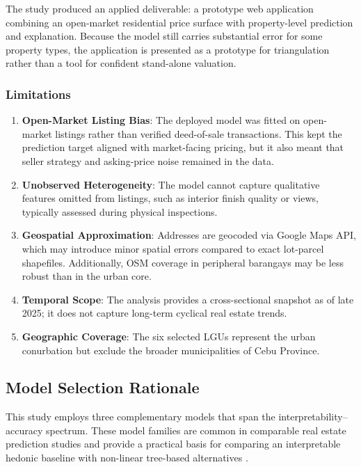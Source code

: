 The study produced an applied deliverable: a prototype web application combining an open-market residential price surface with property-level prediction and explanation. Because the model still carries substantial error for some property types, the application is presented as a prototype for triangulation rather than a tool for confident stand-alone valuation.

\subsubsection{Limitations}\label{limitations}

\begin{enumerate}
\item \textbf{Open-Market Listing Bias}: The deployed model was fitted on open-market listings rather than verified deed-of-sale transactions. This kept the prediction target aligned with market-facing pricing, but it also meant that seller strategy and asking-price noise remained in the data.
\item \textbf{Unobserved Heterogeneity}: The model cannot capture qualitative features omitted from listings, such as interior finish quality or views, typically assessed during physical inspections.
\item \textbf{Geospatial Approximation}: Addresses are geocoded via Google Maps API, which may introduce minor spatial errors compared to exact lot-parcel shapefiles. Additionally, OSM coverage in peripheral barangays may be less robust than in the urban core.
\item \textbf{Temporal Scope}: The analysis provides a cross-sectional snapshot as of late 2025; it does not capture long-term cyclical real estate trends.
\item \textbf{Geographic Coverage}: The six selected LGUs represent the urban conurbation but exclude the broader municipalities of Cebu Province.
\end{enumerate}


\subsection{Model Selection Rationale}\label{model-selection-rationale}

This study employs three complementary models that span the interpretability--accuracy spectrum. These model families are common in comparable real estate prediction studies and provide a practical basis for comparing an interpretable hedonic baseline with non-linear tree-based alternatives \parencite{yacim2018,pai2020}.

